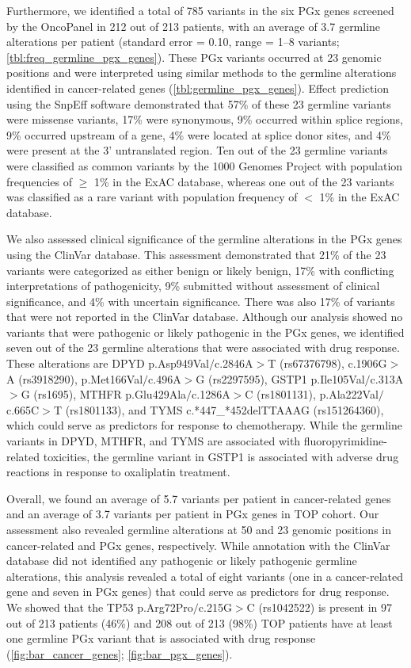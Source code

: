 Furthermore, we identified a total of 785 variants in the six PGx genes screened by the OncoPanel in 212 out of 213 patients, with an average of 3.7 germline alterations per patient (standard error = 0.10, range = 1--8 variants; \autoref{tbl:freq_germline_pgx_genes}). These PGx variants occurred at 23 genomic positions and were interpreted using similar methods to the germline alterations identified in cancer-related genes (\autoref{tbl:germline_pgx_genes}). Effect prediction using the SnpEff software demonstrated that 57\% of these 23 germline variants were missense variants, 17\% were synonymous, 9\% occurred within splice regions, 9\% occurred upstream of a gene, 4\% were located at splice donor sites, and 4\% were present at the 3' untranslated region. Ten out of the 23 germline variants were classified as common variants by the 1000 Genomes Project with population frequencies of $\geq$ 1\% in the ExAC database, whereas one out of the 23 variants was classified as a rare variant with population frequency of $<$ 1\% in the ExAC database.

We also assessed clinical significance of the germline alterations in the PGx genes using the ClinVar database. This assessment demonstrated that 21\% of the 23 variants were categorized as either benign or likely benign, 17\% with conflicting interpretations of pathogenicity, 9\% submitted without assessment of clinical significance, and 4\% with uncertain significance. There was also 17\% of variants that were not reported in the ClinVar database. Although our analysis showed no variants that were pathogenic or likely pathogenic in the PGx genes, we identified seven out of the 23 germline alterations that were associated with drug response. These alterations are DPYD p.Asp949Val$/$c.2846A$>$T (rs67376798), c.1906G$>$A (rs3918290), p.Met166Val$/$c.496A$>$G (rs2297595), GSTP1 p.Ile105Val$/$c.313A$>$G (rs1695), MTHFR p.Glu429Ala$/$c.1286A$>$C (rs1801131), p.Ala222Val$/$c.665C$>$T (rs1801133), and TYMS c.*447\_*452delTTAAAG (rs151264360), which could serve as predictors for response to chemotherapy. While the germline variants in DPYD, MTHFR, and TYMS are associated with fluoropyrimidine-related toxicities, the germline variant in GSTP1 is associated with adverse drug reactions in response to oxaliplatin treatment.

Overall, we found an average of 5.7 variants per patient in cancer-related genes and an average of 3.7 variants per patient in PGx genes in TOP cohort. Our assessment also revealed germline alterations at 50 and 23 genomic positions in cancer-related and PGx genes, respectively. While annotation with the ClinVar database did not identified any pathogenic or likely pathogenic germline alterations, this analysis revealed a total of eight variants (one in a cancer-related gene and seven in PGx genes) that could serve as predictors for drug response. We showed that the TP53 p.Arg72Pro$/$c.215G$>$C (rs1042522) is present in 97 out of 213 patients (46\%) and 208 out of 213 (98\%) TOP patients have at least one germline PGx variant that is associated with drug response (\autoref{fig:bar_cancer_genes}; \autoref{fig:bar_pgx_genes}).



